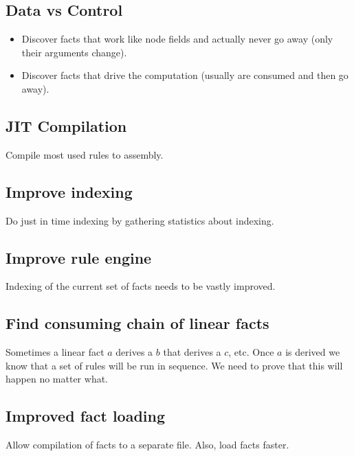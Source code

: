 
\subsection{Data vs Control}

\begin{itemize}
   \item Discover facts that work like node fields and actually never go away (only their arguments change).
   \item Discover facts that drive the computation (usually are consumed and then go away).
\end{itemize}

\subsection{JIT Compilation}

Compile most used rules to assembly.

\subsection{Improve indexing}

Do just in time indexing by gathering statistics about indexing.

\subsection{Improve rule engine}

Indexing of the current set of facts needs to be vastly improved.

\subsection{Find consuming chain of linear facts}

Sometimes a linear fact $a$ derives a $b$ that derives a $c$, etc. Once $a$ is derived we know that a set of rules will be run in sequence. We need to prove that this will happen no matter what.

\subsection{Improved fact loading}

Allow compilation of facts to a separate file. Also, load facts faster.
